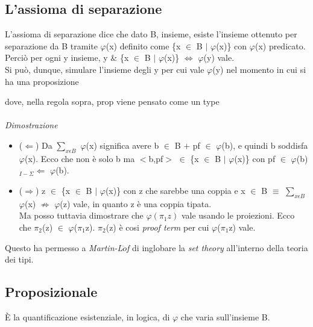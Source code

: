 \subsection{L'assioma di separazione}
\label{subsec:assioma-di-separazione}
L'assioma di separazione dice che dato B, insieme, esiste l'insieme ottenuto per separazione da B tramite $\varphi$(x) definito come  \{x $\in$ B $|$ $\varphi$(x)\} con $\varphi$(x) predicato.\\
Perci\`o per ogni y insieme, y \& \{x $\in$ B $|$ $\varphi$(x)\} $\Leftrightarrow$ $\varphi$(y) vale.\\
Si pu\`o, dunque, simulare l'insieme degli y per cui vale $\varphi$(y) nel momento in cui si ha una proposizione 
\begin{prooftree}
\end{prooftree}
\noindent
dove, nella regola sopra, prop viene pensato come un type\\\\
\noindent
\textit{Dimostrazione}
\begin{itemize}
\item ($\Leftarrow$) Da $\sum\limits_{x \epsilon B}$ $\varphi$(x) significa avere b $\in$ B $+$ pf $\in$ $\varphi$(b), e quindi b soddisfa $\varphi$(x). Ecco che non \`e solo b ma $<$b,pf$>$ $\in$ \{x $\in$ B $|$ $\varphi$(x)\} con pf $\in$ $\varphi$(b) $_{I-\Sigma}\Leftarrow$ $\varphi$(b).\\
\item ($\Rightarrow$) z $\in$ \{x $\in$ B $|$ $\varphi$(x)\} con z che sarebbe una coppia e x $\in$ B $\equiv$ $\sum\limits_{x \epsilon B}$ $\varphi$(x) $\nRightarrow$ $\varphi$(z) vale, in quanto z \`e una coppia tipata.\\ 
Ma posso tuttavia dimostrare che $\varphi(\pi_1z)$ vale usando le proiezioni. Ecco che $\pi_2$(z) $\in$ $\varphi$($\pi_1$z). $\pi_2$(z) \`e cosi \textit{proof term} per cui $\varphi$($\pi_1$z) vale.
\end{itemize}
\noindent
Questo ha permesso a \textit{Martin-L$\ddot{o}$f} di inglobare la \textit{set theory} all'interno della teoria dei tipi.

\subsection{Proposizionale}
\label{subsec:proposizionale}
\begin{prooftree}
\end{prooftree}
\noindent
\`E la quantificazione esistenziale, in logica, di $\varphi$ che varia sull'insieme B.\\
\noindent
